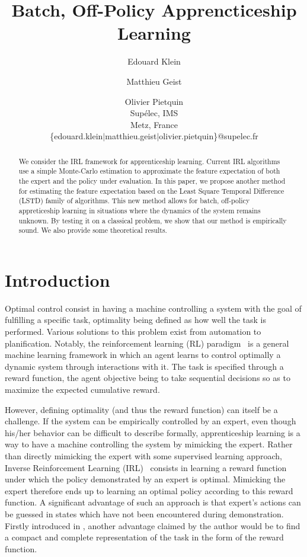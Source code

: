 \documentclass{article}
\title{Batch, Off-Policy Apprencticeship Learning}
\author{Edouard Klein \and Matthieu Geist \and Olivier Pietquin \\
Supélec, IMS\\
Metz, France \\
\{edouard.klein$|$matthieu.geist$|$olivier.pietquin\}@supelec.fr}
\begin{document}
\maketitle
\begin{abstract}
We consider the IRL framework for apprenticeship learning. %
Current IRL algorithms use a simple Monte-Carlo estimation to approximate the feature expectation of both the expert and the policy under evaluation. %
In this paper, we propose another method for estimating the feature expectation based on the Least Square Temporal Difference (LSTD) family of algorithms. %
This new method allows for batch, off-policy appreticeship learning in situations where the dynamics of the system remains unknown. %
By testing it on a classical problem, we show that our method is empirically sound.%
We also provide some theoretical results.%
\end{abstract}
\section{Introduction}

Optimal control consist in having a machine controlling a system
with the goal of fulfilling a specific task, optimality being
defined as how well the task is performed. Various solutions to this
problem exist from automation to planification. Notably, the
reinforcement learning (RL) paradigm~\citep{sutton1998reinforcement} is a general
machine learning framework in which an agent learns to control
optimally a dynamic system through interactions with it. The task is
specified through a reward function, the agent objective being to
take sequential decisions so as to maximize the expected cumulative
reward.

However, defining optimality (and thus the reward function) can
itself be a challenge. If the system can be empirically controlled
by an expert, even though his/her behavior can be difficult to
describe formally, apprenticeship learning is a way to have a
machine controlling the system by mimicking the expert. Rather than
directly mimicking the expert with some supervised learning
approach, Inverse Reinforcement Learning (IRL)~\citep{ng2000algorithms}
consists in learning a reward function under which the policy
demonstrated by an expert is optimal. Mimicking the expert therefore
ends up to learning an optimal policy according to this reward
function. A significant advantage of such an approach is that
expert's actions can be guessed in states which have not been
encountered during demonstration. Firstly introduced in \citep{russell1998learning}, another advantage claimed by the author would be to
find a compact and complete representation of the task in the form
of the reward function.
\end{document}
